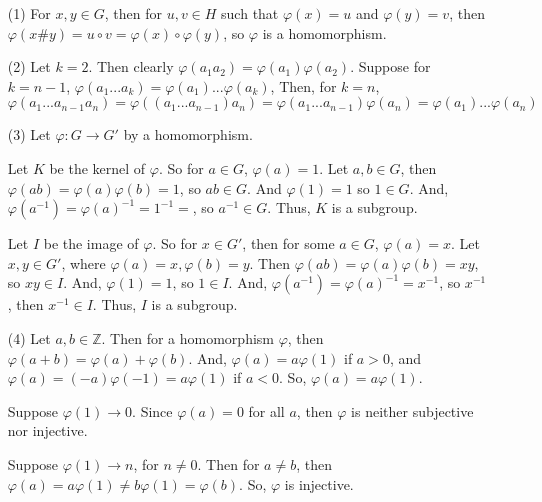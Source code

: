 %
%
\begin{itemize}
\item[(1)]
For $x, y \in G$, then for $u, v \in H$ such that $\varphi(x) = u$ and $\varphi(y) = v$, then $\varphi(x \# y) = u \circ v = \varphi(x) \circ \varphi(y)$, so $\varphi$ is a homomorphism.
\item[(2)] Let $k = 2$. Then clearly $\varphi(a_1a_2) = \varphi(a_1)\varphi(a_2)$. Suppose for $k = n - 1$, $\varphi(a_1...a_k) = \varphi(a_1)...\varphi(a_k)$, Then, for $k = n$,
$$\varphi(a_1...a_{n-1}a_n) = \varphi((a_1...a_{n-1})a_n) = \varphi(a_1...a_{n-1})\varphi(a_n) = \varphi(a_1)...\varphi(a_n)$$
\item[(3)]
Let $\varphi: G \rightarrow G'$ by a homomorphism.

Let $K$ be the kernel of $\varphi$. So for $a \in G$, $\varphi(a) = 1$. Let $a, b \in G$, then $\varphi(ab) = \varphi(a)\varphi(b) = 1$, so $ab \in G$. And $\varphi(1) = 1$ so $1 \in G$. And, $\varphi(a^{-1}) = \varphi(a)^{-1} = 1^{-1} = $, so $a^{-1} \in G$. Thus, $K$ is a subgroup.

Let $I$ be the image of $\varphi$. So for $x \in G'$, then for some $a \in G$, $\varphi(a) = x$. Let $x, y \in G'$, where $\varphi(a) = x, \varphi(b) = y$. Then $\varphi(ab) = \varphi(a)\varphi(b) = xy$, so $xy \in I$. And, $\varphi(1) = 1$, so $1 \in I$. And, $\varphi(a^{-1}) = \varphi(a)^{-1} = x^{-1}$, so $x^{-1}$, then $x^{-1} \in I$. Thus, $I$ is a subgroup.
\item[(4)] Let $a, b \in \mathbb{Z}$. Then for a homomorphism $\varphi$, then $\varphi(a+b) = \varphi(a) + \varphi(b)$. And, $\varphi(a) = a\varphi(1)$ if $a >0$, and $\varphi(a) = (-a)\varphi(-1) = a\varphi(1)$ if $a < 0$. So, $\varphi(a) = a\varphi(1)$.

Suppose $\varphi(1) \rightarrow 0$. Since $\varphi(a) = 0$ for all $a$, then $\varphi$ is neither subjective nor injective.

Suppose $\varphi(1) \rightarrow n$, for $n \neq 0$. Then for $a \neq b$, then $\varphi(a) = a\varphi(1) \neq b\varphi(1) = \varphi(b)$. So, $\varphi$ is injective.


\end{itemize}
